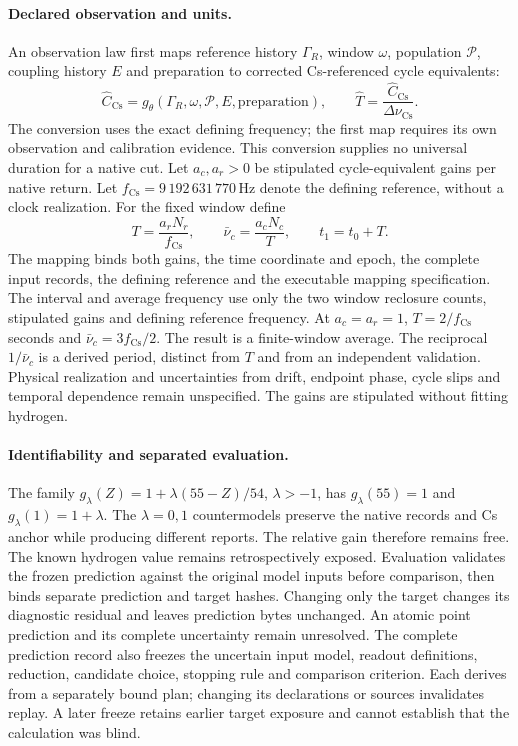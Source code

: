 \paragraph{Declared observation and units.}
An observation law first maps reference history \(\Gamma_R\), window
\(\omega\), population \(\mathcal P\), coupling history \(E\) and preparation
to corrected Cs-referenced cycle equivalents:
\begin{equation}
 \widehat C_{\mathrm{Cs}}
   =g_\theta(\Gamma_R,\omega,\mathcal P,E,\mathrm{preparation}),
 \qquad
 \widehat T=\frac{\widehat C_{\mathrm{Cs}}}{\Delta\nu_{\mathrm{Cs}}}.
 \label{eq:manual-m3-cycle-bridge}
\end{equation}
The conversion uses the exact defining frequency; the first map requires
its own observation and calibration evidence. This conversion supplies no
universal duration for a native cut.
Let \(a_c,a_r>0\) be stipulated cycle-equivalent gains per native return.
Let \(f_{\mathrm{Cs}}=9\,192\,631\,770\,\mathrm{Hz}\) denote the defining
reference, without a clock realization. For the fixed window define
\[
 T=\frac{a_rN_r}{f_{\mathrm{Cs}}},\qquad
 \bar\nu_c=\frac{a_cN_c}{T},\qquad
 t_1=t_0+T.
\]
The mapping binds both gains, the time coordinate and epoch, the complete
input records, the defining reference and the executable mapping specification.
The interval and average frequency use only the two window reclosure counts,
stipulated gains and defining reference frequency.
At \(a_c=a_r=1\), \(T=2/f_{\mathrm{Cs}}\) seconds and
\(\bar\nu_c=3f_{\mathrm{Cs}}/2\).
The result is a finite-window average.
The reciprocal \(1/\bar\nu_c\) is a derived period, distinct from \(T\)
and from an independent validation. Physical realization and uncertainties from
drift, endpoint phase, cycle slips and temporal dependence remain unspecified.
The gains are stipulated without fitting hydrogen.

\paragraph{Identifiability and separated evaluation.}
The family \(g_\lambda(Z)=1+\lambda(55-Z)/54\), \(\lambda>-1\), has
\(g_\lambda(55)=1\) and \(g_\lambda(1)=1+\lambda\).
The \(\lambda=0,1\) countermodels preserve the native records and Cs anchor
while producing different reports. The relative gain therefore remains free.
The known hydrogen value remains retrospectively exposed. Evaluation validates
the frozen prediction against the original model inputs before comparison,
then binds separate prediction and target hashes. Changing only the
target changes its diagnostic residual and leaves prediction bytes unchanged.
An atomic point prediction and its complete uncertainty remain unresolved.
The complete prediction record also freezes the uncertain input model,
readout definitions, reduction, candidate choice, stopping rule and comparison
criterion. Each derives from a separately bound plan; changing its declarations
or sources invalidates replay. A later freeze retains earlier target exposure
and cannot establish that the calculation was blind.

